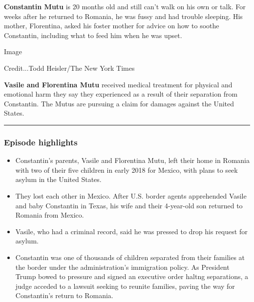 \textbf{Constantin Mutu} is 20 months old and still can't walk on his
own or talk. For weeks after he returned to Romania, he was fussy and
had trouble sleeping. His mother, Florentina, asked his foster mother
for advice on how to soothe Constantin, including what to feed him when
he was upset.

Image

Credit...Todd Heisler/The New York Times

\textbf{Vasile and Florentina Mutu} received medical treatment for
physical and emotional harm they say they experienced as a result of
their separation from Constantin. The Mutus are pursuing a claim for
damages against the United States.

\begin{center}\rule{0.5\linewidth}{\linethickness}\end{center}

\hypertarget{episode-highlights-}{%
\subsubsection{Episode highlights }\label{episode-highlights-}}

\begin{itemize}
\item
  Constantin's parents, Vasile and Florentina Mutu, left their home in
  Romania with two of their five children in early 2018 for Mexico, with
  plans to seek asylum in the United States.
\item
  They lost each other in Mexico. After U.S. border agents apprehended
  Vasile and baby Constantin in Texas, his wife and their 4-year-old son
  returned to Romania from Mexico.
\end{itemize}

\begin{itemize}
\tightlist
\item
  Vasile, who had a criminal record, said he was pressed to drop his
  request for asylum.
\end{itemize}

\begin{itemize}
\tightlist
\item
  Constantin was one of thousands of children separated from their
  families at the border under the administration's immigration policy.
  As President Trump bowed to pressure and signed an executive order
  haltng separations, a judge acceded to a lawsuit seeking to reunite
  families, paving the way for Constantin's return to Romania.
\end{itemize}

